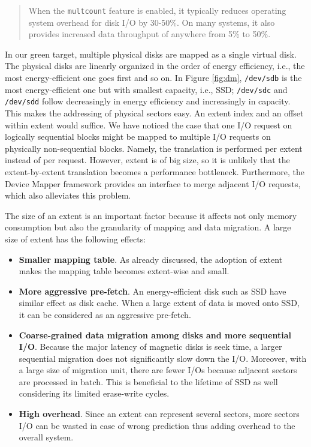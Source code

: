 \begin{quotation}
When the \texttt{multcount} feature is enabled, it typically reduces
operating system overhead for disk I/O by 30-50\%. On many systems, it
also provides increased data throughput of anywhere from 5\% to 50\%.
\end{quotation}

In our green target, multiple physical disks are mapped as a single
virtual disk. The physical disks are linearly organized in the order
of energy efficiency, i.e., the most energy-efficient one goes first
and so on. In Figure \ref{fig:dm}, \texttt{/dev/sdb} is the most
energy-efficient one but with smallest capacity, i.e., SSD;
\texttt{/dev/sdc} and \texttt{/dev/sdd} follow decreasingly in energy
efficiency and increasingly in capacity. This makes the addressing of
physical sectors easy. An extent index and an offset within extent
would suffice. We have noticed the case that one I/O request on logically
sequential blocks might be mapped to multiple I/O requests on
physically non-sequential blocks. Namely, the translation is performed
per extent instead of per request. However, extent is of big size, so
it is unlikely that the extent-by-extent translation becomes a
performance bottleneck. Furthermore, the Device Mapper framework
provides an interface to merge adjacent I/O requests, which also
alleviates this problem.

The size of an extent is an important factor because it affects not
only memory consumption but also the granularity of mapping and data
migration. A large size of extent has the following effects: 

\begin{itemize} 

\item \textbf{Smaller mapping table}. As already discussed, the
adoption of extent makes the mapping table becomes extent-wise and
small. 

\item \textbf{More aggressive pre-fetch}. An energy-efficient disk
such as SSD have similar effect as disk cache. When a large extent of
data is moved onto SSD, it can be considered as an aggressive
pre-fetch. 

\item \textbf{Coarse-grained data migration among disks and more
sequential I/O}. Because the major latency of magnetic disks is seek
time, a larger sequential migration does not significantly slow down
the I/O. Moreover, with a large size of migration unit, there are
fewer I/Os because adjacent sectors are processed in batch. This is
beneficial to the lifetime of SSD as well considering its limited
erase-write cycles.

\item \textbf{High overhead}. Since an extent can represent several
sectors, more sectors I/O can be wasted in case of wrong prediction
thus adding overhead to the overall system. 

\end{itemize}

